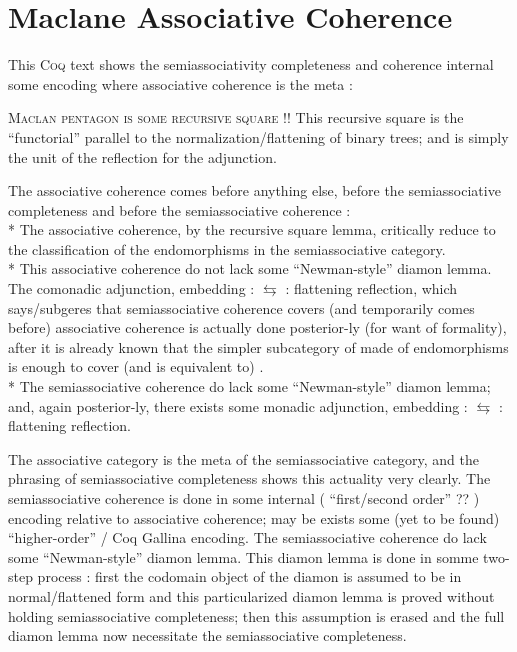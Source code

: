 \begin{coqdoccode}
\coqdocemptyline
\coqdocemptyline
\end{coqdoccode}
\section{Maclane Associative Coherence}

\begin{coqdoccode}
\coqdocemptyline
\coqdocemptyline
\end{coqdoccode}
This \textsc{Coq} text shows the semiassociativity completeness and coherence internal some encoding where associative coherence is the meta :


    \textsc{Maclan pentagon is some recursive square !!} This recursive square  is the ``functorial'' parallel to the normalization/flattening of binary trees; and is simply the unit of the reflection for the adjunction.


    The associative coherence comes before anything else, before the semiassociative completeness and before the semiassociative coherence :
\\  * The associative coherence, by the recursive square lemma, critically reduce to the classification of the endomorphisms in the semiassociative category. 
\\ * This associative coherence do not lack some ``Newman-style'' diamon lemma. The comonadic  adjunction, embedding :  $\leftrightarrows$  : flattening reflection, which says/subgeres that semiassociative coherence covers (and temporarily comes before) associative coherence is actually done posterior-ly (for want of formality), after it is already known that the simpler  subcategory of  made of endomorphisms is enough to cover (and is equivalent to) .
\\ * The semiassociative coherence do lack some ``Newman-style'' diamon lemma; and, again posterior-ly, there exists some monadic adjunction, embedding :  $\leftrightarrows$  : flattening reflection.


    The associative category is the meta of the semiassociative category, and the phrasing of semiassociative completeness  shows this actuality very clearly. The semiassociative coherence is done in some internal ( ``first/second order'' ?? ) encoding relative to associative coherence; may be exists some (yet to be found) ``higher-order'' / Coq Gallina encoding. The semiassociative coherence do lack some ``Newman-style'' diamon lemma. This diamon lemma is done in somme two-step process : first the codomain object of the diamon is assumed to be in normal/flattened form and this particularized diamon lemma  is proved without holding semiassociative completeness; then this assumption is erased and the full diamon lemma  now necessitate the semiassociative completeness.



